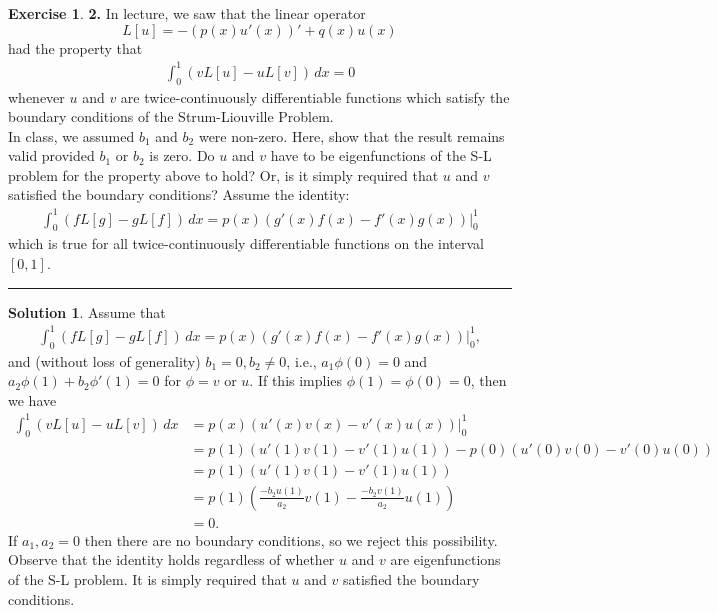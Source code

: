 \documentclass{article}
\theoremstyle{definition}
\newtheorem*{exer*}{Exercise}
\newtheorem*{sln*}{Solution}
\begin{document}
\begin{exer*}\textbf{2. } In lecture, we saw that the linear operator $$L[u] = -(p(x)u'(x))' + q(x)u(x)$$ had the property that
	\begin{align*}
	\int^1_0 (vL[u] - uL[v])\,dx = 0
	\end{align*}
	whenever $u$ and $v$ are twice-continuously differentiable functions which satisfy the boundary conditions of the Strum-Liouville Problem. \\
	
	In class, we assumed $b_1$ and $b_2$ were non-zero. Here, show that the result remains valid
	provided $b_1$ or $b_2$ is zero. Do $u$ and $v$ have to be eigenfunctions of the S-L problem for the property above to hold? Or, is it simply required that $u$ and $v$ satisfied the boundary conditions? Assume the identity:
	\begin{align*}
	\int^1_0 (fL[g] - gL[f])\,dx = p(x)(g'(x)f(x) - f'(x)g(x))\bigg\vert^1_0
	\end{align*}
	which is true for all twice-continuously differentiable functions on the interval $[0,1]$.
	
	\noindent\rule{\textwidth}{0.5pt}
	
	\begin{sln*}
		Assume that
		\begin{align*}
		\int^1_0 (fL[g] - gL[f])\,dx = p(x)(g'(x)f(x) - f'(x)g(x))\bigg\vert^1_0,
		\end{align*}
		and (without loss of generality) $b_1 = 0, b_2\neq 0$, i.e., $a_1\phi(0) = 0$ and $a_2\phi(1) + b_2\phi'(1) =0 $ for $\phi = v$ or $u$. If this implies $\phi(1) = \phi(0) = 0$, then  we have
		\begin{align*}
		\int^1_0 (vL[u] - uL[v])\,dx &= p(x)(u'(x)v(x) - v'(x)u(x))\bigg\vert^1_0\\
		&= p(1)(u'(1)v(1) - v'(1)u(1)) - p(0)(u'(0)v(0) - v'(0)u(0))\\
		&= p(1)(u'(1)v(1) - v'(1)u(1))\\
		&= p(1)\left( \frac{-b_2u(1)}{a_2}v(1) - \frac{-b_2v(1)}{a_2}u(1) \right)\\
		&= 0.
		\end{align*}
		If $a_1, a_2 = 0$ then there are no boundary conditions, so we reject this possibility.\\
		
		Observe that the identity holds regardless of whether $u$ and $v$ are eigenfunctions of the S-L problem. It is simply required that $u$ and $v$ satisfied the boundary conditions. 
	\end{sln*}
\end{exer*}
\end{document}
